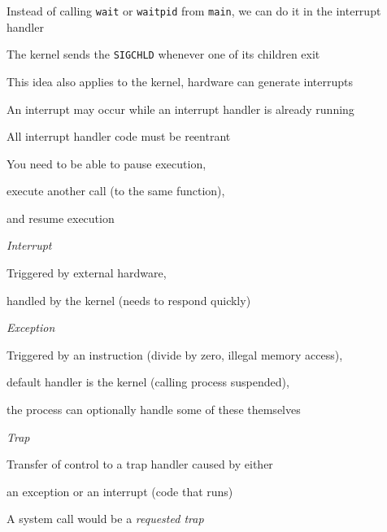   \begin{slide}


    Instead of calling \texttt{wait} or \texttt{waitpid} from \texttt{main},
    we can do it in the interrupt handler

    \leftspace{}The kernel sends the \texttt{SIGCHLD} whenever one of its
                  children exit
    \medskip

    This idea also applies to the kernel, hardware can generate interrupts

  \end{slide}

  \begin{slide}



    An interrupt may occur while an interrupt handler is already running
    \bigskip

    All interrupt handler code must be reentrant

    \leftspace{}You need to be able to pause execution,

    \leftspace{}execute another call (to the same function),

    \leftspace{}and resume execution

  \end{slide}

  \begin{slide}


    \textit{Interrupt}

    \leftspace{}Triggered by external hardware,

    \leftspace{}handled by the kernel (needs to respond quickly)
    \bigskip

    \textit{Exception}

    \leftspace{}Triggered by an instruction (divide by zero, illegal memory
                  access),

    \leftspace{}default handler is the kernel (calling process suspended),

    \leftspace{}the process can optionally handle some of these themselves
    \bigskip

    \textit{Trap}

    \leftspace{}Transfer of control to a trap handler caused by either

    \leftspace{}an exception or an interrupt (code that runs)
    \medskip

    A system call would be a \textit{requested trap}
  \end{slide}

